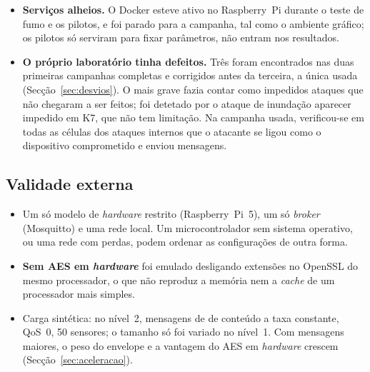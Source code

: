 \begin{itemize}[leftmargin=*]
    não tem criptografia, surgem nos pilotos picos de 22 a 40~ms no p99,9 e no
    máximo, a cargas intermédias.  Não afetam o p99
    abaixo de cerca de 300~mensagens/s por sensor. Na campanha, os maiores valores nas execuções de custo foram de
    0,5~ms em K0. 
  \item \textbf{Serviços alheios.} O Docker esteve ativo no Raspberry~Pi durante o
    teste de fumo e os pilotos, e foi parado para a campanha, tal como o ambiente
    gráfico; os pilotos só serviram para fixar parâmetros, não entram nos
    resultados.
  \item \textbf{O próprio laboratório tinha defeitos.} Três foram encontrados nas
    duas primeiras campanhas completas e corrigidos antes da terceira, a única
    usada (Secção~\ref{sec:desvios}). O mais grave fazia contar como impedidos
    ataques que não chegaram a ser feitos; foi detetado por o ataque de inundação
    aparecer impedido em K7, que não tem limitação. Na campanha usada,
    verificou-se em todas as células dos ataques internos que o atacante se ligou
    como o dispositivo comprometido e enviou mensagens.
\end{itemize}

\subsection{Validade externa}

\begin{itemize}[leftmargin=*]
  \item Um só modelo de \emph{hardware} restrito (Raspberry~Pi~5), um só
    \emph{broker} (Mosquitto) e uma rede local. Um microcontrolador sem sistema
    operativo, ou uma rede com perdas, podem ordenar as configurações de outra
    forma. 
  \item \textbf{Sem AES em \emph{hardware}} foi emulado desligando extensões no
    OpenSSL do mesmo processador, o que não reproduz a memória nem a
    \emph{cache} de um processador mais simples.
  \item Carga sintética: no nível~2, mensagens de  de conteúdo a taxa
    constante, QoS~0, 50 sensores; o tamanho só foi variado no nível~1. Com
    mensagens maiores, o peso do envelope e a vantagem do AES em \emph{hardware}
    crescem (Secção~\ref{sec:aceleracao}).
\end{itemize}

